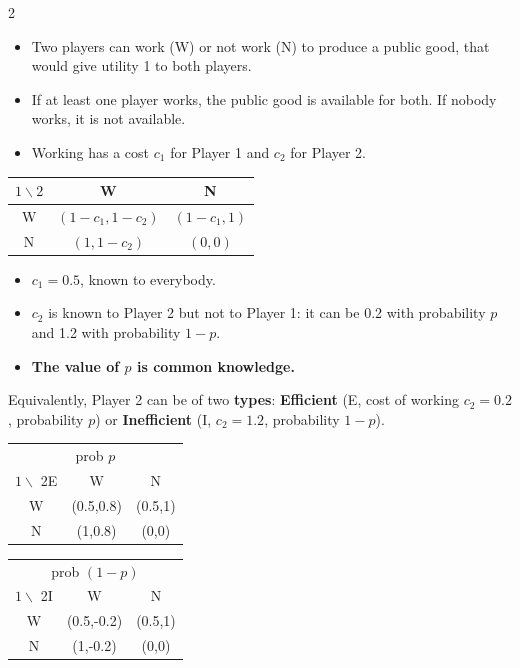 \documentclass[a4paper,9pt]{extarticle}
\begin{document}
\begin{multicols}{2}
\begin{example}
\begin{itemize}
\item Two players can work (W) or not work (N) to produce a public good, that would give
utility 1 to both players.

\item If at least one player works, the public good is available for both. If nobody works,
it is not available.

\item Working has a cost $c_1$ for Player 1 and $c_2$ for Player 2.

\end{itemize}

\begin{center}
\begin{tabular}{c|cc}
$1 \backslash 2$ & W & N \\
\hline
W & $(1-c_1, 1-c_2)$ & $(1-c_1, 1)$ \\
N & $(1, 1-c_2)$ & $(0,0)$ \\
\end{tabular}
\end{center}

\begin{itemize}

\item $c_1 = 0.5$, known to everybody.

\item $c_2$ is known to Player 2 but not to Player 1: it can be 0.2 with probability $p$
and 1.2 with probability $1-p$.

\item \textbf{The value of $p$ is common knowledge.}

\end{itemize}

\end{example}


Equivalently, Player 2 can be of two \textbf{types}: \textbf{Efficient} (E, cost of working
$c_2 = 0.2$, probability $p$) or \textbf{Inefficient} (I, $c_2 = 1.2$, probability $1-p$).


\begin{center}
\small
\begin{tabular}{c|cc}
\multicolumn{3}{c}{prob $p$} \\
$1 \backslash$ 2E & W & N \\
\hline
W & (0.5,0.8) & (0.5,1) \\
N & (1,0.8) & (0,0) \\
\end{tabular}
\quad
\begin{tabular}{c|cc}
\multicolumn{3}{c}{prob $(1-p)$} \\
$1 \backslash$ 2I & W & N \\
\hline
W & (0.5,-0.2) & (0.5,1) \\
N & (1,-0.2) & (0,0) \\
\end{tabular}
\end{center}



\end{multicols}
\end{document}
